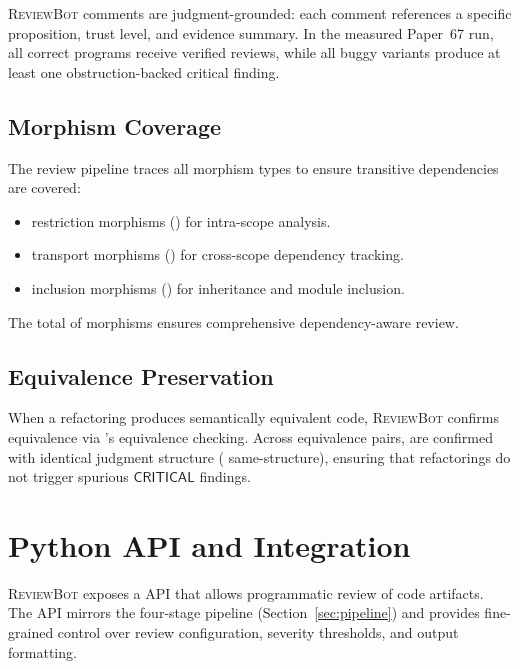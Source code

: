 \documentclass[11pt]{article}
\newcommand{\ReviewBot}{\textsc{ReviewBot}}
\newcommand{\SevCritical}{\mathsf{CRITICAL}}
\begin{document}
\ReviewBot{} comments are judgment-grounded: each comment references a
specific proposition, trust level, and evidence summary. In the measured
Paper~67 run, all \ppLXVIIcorrectCount{} correct programs receive verified
reviews, while all \ppLXVIItruePositive{} buggy variants produce at least one
obstruction-backed critical finding.

\subsection{Morphism Coverage}

The review pipeline traces all morphism types to ensure transitive
dependencies are covered:
\begin{itemize}[leftmargin=*]
  \item \compMorphRestriction{} restriction morphisms
        (\compMorphRestrictionPct{}) for intra-scope analysis.
  \item \compMorphTransport{} transport morphisms
        (\compMorphTransportPct{}) for cross-scope dependency tracking.
  \item \compMorphInclusion{} inclusion morphisms
        (\compMorphInclusionPct{}) for inheritance and module inclusion.
\end{itemize}
The total of \compMorphTotal{} morphisms ensures comprehensive
dependency-aware review.

\subsection{Equivalence Preservation}

When a refactoring produces semantically equivalent code, \ReviewBot{}
confirms equivalence via \JuGeo{}'s equivalence checking. Across
\compEquivPairs{} equivalence pairs, \compEquivBothVerified{} are confirmed
with identical judgment structure (\compEquivSameStructure{} same-structure),
ensuring that refactorings do not trigger spurious $\SevCritical$ findings.

\section{Python API and Integration}\label{sec:python-api}

\ReviewBot{} exposes a \Python{} API that allows programmatic review of
code artifacts. The API mirrors the four-stage pipeline
(Section~\ref{sec:pipeline}) and provides fine-grained control over
review configuration, severity thresholds, and output formatting.
\end{document}
